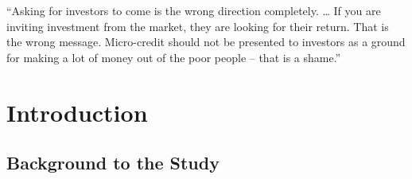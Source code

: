 \documentclass[a4paper, nobind]{templates/ociamthesis}
\begin{document}
\begin{romanpages}
\flushbottom

\tableofcontents

\listoffigures
	\mtcaddchapter

\listoftables
  \mtcaddchapter


\end{romanpages}

\flushbottom

\begin{savequote}
``Asking for investors to come is the wrong direction completely.
\ldots{} If you are inviting investment from the market, they are
looking for their return. That is the wrong message. Micro-credit should
not be presented to investors as a ground for making a lot of money out
of the poor people -- that is a shame.''
\end{savequote}



\hypertarget{rmd-basics}{%
\chapter{Introduction}\label{rmd-basics}}

\minitoc 

\hypertarget{background-to-the-study}{%
\section{Background to the Study}\label{background-to-the-study}}
\end{document}
